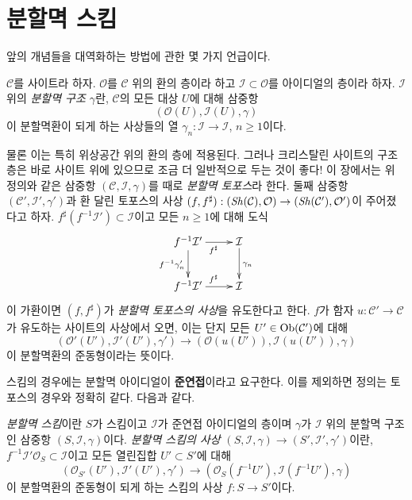 \section{분할멱 스킴}
\label{section-divided-power-schemes}

\noindent
앞의 개념들을 대역화하는 방법에 관한 몇 가지 언급이다.

\begin{definition}
\label{definition-divided-power-structure}
$\mathcal{C}$를 사이트라 하자. $\mathcal{O}$를 $\mathcal{C}$ 위의
환의 층이라 하고 $\mathcal{I} \subset \mathcal{O}$를 아이디얼의
층이라 하자. $\mathcal{I}$ 위의 {\it 분할멱 구조 $\gamma$}란,
$\mathcal{C}$의 모든 대상 $U$에 대해 삼중항
$$
(\mathcal{O}(U), \mathcal{I}(U), \gamma)
$$
이 분할멱환이 되게 하는 사상들의 열
$\gamma_n : \mathcal{I} \to \mathcal{I}$, $n \geq 1$이다.
\end{definition}

\noindent
물론 이는 특히 위상공간 위의 환의 층에 적용된다. 그러나
크리스탈린 사이트의 구조층은 바로 사이트 위에 있으므로 조금 더
일반적으로 두는 것이 좋다! 이 장에서는 위 정의와 같은 삼중항
$(\mathcal{C}, \mathcal{I}, \gamma)$를 때로 {\it 분할멱 토포스}라 한다.
둘째 삼중항 $(\mathcal{C}', \mathcal{I}', \gamma')$과 환 달린
토포스의 사상
$(f, f^\sharp) : (\mathop{\mathit{Sh}}\nolimits(\mathcal{C}), \mathcal{O}) \to
(\mathop{\mathit{Sh}}\nolimits(\mathcal{C}'), \mathcal{O}')$이 주어졌다고 하자.
$f^\sharp(f^{-1}\mathcal{I}') \subset \mathcal{I}$이고 모든
$n \geq 1$에 대해 도식
$$
\xymatrix{
f^{-1}\mathcal{I}' \ar[d]_{f^{-1}\gamma'_n} \ar[r]_{f^\sharp} &
\mathcal{I} \ar[d]^{\gamma_n} \\
f^{-1}\mathcal{I}' \ar[r]^{f^\sharp} & \mathcal{I}
}
$$
이 가환이면 $(f, f^\sharp)$가 {\it 분할멱 토포스의 사상}을
유도한다고 한다. $f$가 함자 $u : \mathcal{C}' \to \mathcal{C}$가
유도하는 사이트의 사상에서 오면, 이는 단지 모든
$U' \in \mathop{\mathrm{Ob}}\nolimits(\mathcal{C}')$에 대해
$$
(\mathcal{O}'(U'), \mathcal{I}'(U'), \gamma')
\longrightarrow
(\mathcal{O}(u(U')), \mathcal{I}(u(U')), \gamma)
$$
이 분할멱환의 준동형이라는 뜻이다.

\medskip\noindent
스킴의 경우에는 분할멱 아이디얼이 {\bf 준연접}이라고 요구한다.
이를 제외하면 정의는 토포스의 경우와 정확히 같다. 다음과 같다.

\begin{definition}
\label{definition-divided-power-scheme}
{\it 분할멱 스킴}이란 $S$가 스킴이고 $\mathcal{I}$가 준연접
아이디얼의 층이며 $\gamma$가 $\mathcal{I}$ 위의 분할멱 구조인
삼중항 $(S, \mathcal{I}, \gamma)$이다.
{\it 분할멱 스킴의 사상}
$(S, \mathcal{I}, \gamma) \to (S', \mathcal{I}', \gamma')$이란,
$f^{-1}\mathcal{I}'\mathcal{O}_S \subset \mathcal{I}$이고 모든 열린집합
$U' \subset S'$에 대해
$$
(\mathcal{O}_{S'}(U'), \mathcal{I}'(U'), \gamma')
\longrightarrow
(\mathcal{O}_S(f^{-1}U'), \mathcal{I}(f^{-1}U'), \gamma)
$$
이 분할멱환의 준동형이 되게 하는 스킴의 사상 $f : S \to S'$이다.
\end{definition}

